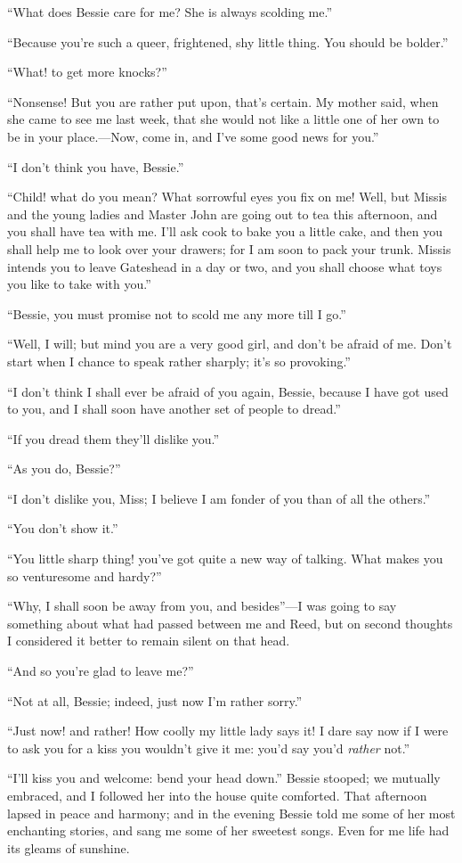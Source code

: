 \enquote{What does Bessie care for me? She is always scolding me.}

\enquote{Because you're such a queer, frightened, shy little thing. You
should be bolder.}

\enquote{What! to get more knocks?}

\enquote{Nonsense! But you are rather put upon, that's certain. My
mother said, when she came to see me last week, that she would not like
a little one of her own to be in your place.---Now, come in, and I've
some good news for you.}

\enquote{I don't think you have, Bessie.}

\enquote{Child! what do you mean? What sorrowful eyes you fix on me! 
Well, but Missis and the young ladies and Master John are going out to
tea this afternoon, and you shall have tea with me. I'll ask cook to
bake you a little cake, and then you shall help me to look over your
drawers; for I am soon to pack your trunk. Missis intends you to leave
Gateshead in a day or two, and you shall choose what toys you like to
take with you.}

\enquote{Bessie, you must promise not to scold me any more till I go.}

\enquote{Well, I will; but mind you are a very good girl, and don't be
afraid of me. Don't start when I chance to speak rather sharply; it's
so provoking.}

\enquote{I don't think I shall ever be afraid of you again, Bessie,
because I have got used to you, and I shall soon have another set of
people to dread.}

\enquote{If you dread them they'll dislike you.}

\enquote{As you do, Bessie?}

\enquote{I don't dislike you, Miss; I believe I am fonder of you than of
all the others.}

\enquote{You don't show it.}

\enquote{You little sharp thing! you've got quite a new way of talking. 
What makes you so venturesome and hardy?}

\enquote{Why, I shall soon be away from you, and besides}---I was going
to say something about what had passed between me and \Mrs{} Reed, but on
second thoughts I considered it better to remain silent on that head.

\enquote{And so you're glad to leave me?}

\enquote{Not at all, Bessie; indeed, just now I'm rather sorry.}

\enquote{Just now! and rather! How coolly my little lady says it! I dare say
now if I were to ask you for a kiss you wouldn't give it me: you'd say
you'd \emph{rather} not.}

\enquote{I'll kiss you and welcome: bend your head down.} Bessie
stooped; we mutually embraced, and I followed her into the house quite
comforted. That afternoon lapsed in peace and harmony; and in the
evening Bessie told me some of her most enchanting stories, and sang me
some of her sweetest songs. Even for me life had its gleams of
sunshine.
